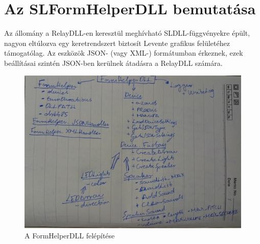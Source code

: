 \documentclass[tocnopagenum]{thesis-ekf}
\begin{document}
	
	\section{Az SLFormHelperDLL bemutatása}
	Az állomány a RelayDLL-en keresztül meghívható SLDLL-függvényekre épült, nagyon eltúlozva egy keretrendszert biztosít Levente grafikus felületéhez támogatólag. Az eszközök JSON- (vagy XML-) formátumban érkeznek, ezek beállításai szintén JSON-ben kerülnek átadásra a RelayDLL számára.
	
	\begin{figure}[H]
		\centering
		\hspace*{-0.5in}
		\includegraphics[scale=0.75]{images/formhelper_kezi.jpg}
		\caption{A FormHelperDLL felépítése}
		\label{fig:formhelper_kezi}
	\end{figure}
	
\end{document}
